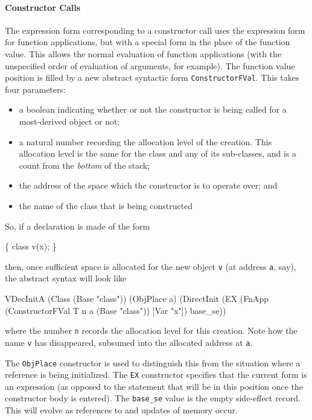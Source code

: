 \documentclass[11pt]{article}
\begin{document}
\paragraph{Constructor Calls}
The expression form corresponding to a constructor call uses the
expression form for function applications, but with a special form in
the place of the function value.  This allows the normal evaluation of
function applications (with the unspecified order of evaluation of
arguments, for example).  The function value position is filled by a
new abstract syntactic form
\texttt{ConstructorFVal}.
This takes four parameters:
\begin{itemize}
\item a boolean indicating whether or not the constructor is being
  called for a most-derived object or not;
\item a natural number recording the allocation level of the
  creation.  This allocation level is the same for the class and any
  of its sub-classes, and is a count from the \emph{bottom} of the
  stack;
\item the address of the space which the constructor is to operate
  over; and
\item the name of the class that is being constructed
\end{itemize}
So, if a declaration is made of the form
\begin{stdrule}
\{
   class v(x);
\}
\end{stdrule}
then, once sufficient space is allocated for the new object \texttt{v}
(at address \texttt{a}, say), the abstract syntax will look like
\begin{stdrule}
   VDecInitA (Class (Base "class"))
             (ObjPlace a)
             (DirectInit
                (EX (FnApp (ConstructorFVal T n a (Base "class"))
                           [Var "x"])
                    base_se))
\end{stdrule}
where the number \texttt{n} records the allocation level for this
creation.  Note how the name \texttt{v} has disappeared, subsumed into
the allocated address at \texttt{a}.

The \texttt{ObjPlace} constructor is used to distinguish this from the
situation where a reference is being initialized.  The \texttt{EX}
constructor specifies that the current form is an expression (as
opposed to the statement that will be in this position once the
constructor body is entered).  The \texttt{base_se} value is the empty
side-effect record.  This will evolve as references to and updates of
memory occur.
\end{document}
